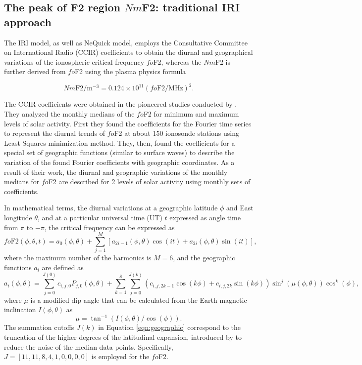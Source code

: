 \documentclass[draft]{agujournal2019}
\begin{document}
\subsection{The peak of F2 region $Nm$F2: traditional IRI approach}\label{sec:F2}

The IRI model, as well as NeQuick \cite{Nav08} model, employs the Consultative Committee on International Radio (CCIR) coefficients to obtain the diurnal and geographical variations of the ionospheric critical frequency $fo$F2, whereas the $Nm$F2 is further derived from $fo$F2 using the plasma physics formula

\begin{equation}\label{eqn:freq2den}
Nm\mathrm{F2}/\mathrm{m^{-3}}=0.124\times 10^{11}(fo\mathrm{F2}/\mathrm{MHz})^2.
\end{equation}

The CCIR coefficients were obtained in the pioneered studies conducted by . They analyzed the monthly medians of the $fo$F2 for minimum and maximum levels of solar activity. First they found the coefficients for the Fourier time series to represent the diurnal trends of $fo$F2 at about 150 ionosonde stations using Least Squares minimization method. They, then, found the coefficients for a special set of geographic functions (similar to surface waves) to describe the variation of the found Fourier coefficients with geographic coordinates. As a result of their work, the diurnal and geographic variations of the monthly medians for $fo$F2 are described for 2 levels of solar activity using monthly sets of coefficients. 

In mathematical terms, the diurnal variations at a geographic latitude $\phi$ and East longitude $\theta$, and at a particular universal time (UT) $t$ expressed as angle time from $\pi$ to $-\pi$, the critical frequency can be expressed as
\begin{equation}\label{eqn:fourier}
fo\mathrm{F2}(\phi,\theta,t)=a_0(\phi, \theta)+\sum_{j=1}^{M}[a_{2i-1}(\phi, \theta)\cos(it)+a_{2i}(\phi, \theta)\sin(it)], 
\end{equation}
where the maximum number of the harmonics is $M=6$, and the geographic functions $a_i$ are defined as 
\begin{equation}\label{eqn:geographic}
a_i(\phi,\theta)=\sum_{j=0}^{J(0)}c_{i,j,0}P_{j,0}(\phi,\theta)+\sum_{k=1}^{8}\sum_{j=0}^{J(k)}(c_{i,j,2k-1}\cos(k\phi)+c_{i,j,2k}\sin(k\phi))\sin^j(\mu(\phi,\theta))\cos^k(\phi),
\end{equation}
where $\mu$ is a modified dip angle that can be calculated from the Earth magnetic inclination $I(\phi,\theta)$ as 
\begin{equation}\label{eqn:modip}
\mu=\tan^{-1}(I(\phi,\theta)/\cos(\phi)).
\end{equation}
The summation cutoffs $J(k)$ in Equation \ref{eqn:geographic} correspond to the truncation of the higher degrees of the latitudinal expansion, introduced by  to reduce the noise of the median data points. Specifically, $J=[11, 11, 8, 4, 1, 0, 0, 0, 0]$ is employed for the $fo$F2. 
\end{document}
